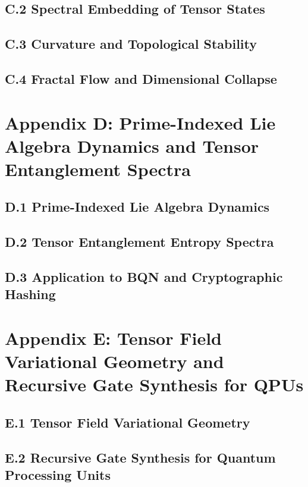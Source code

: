\subsection{C.2 Spectral Embedding of Tensor States}

\subsection{C.3 Curvature and Topological Stability}

\subsection{C.4 Fractal Flow and Dimensional Collapse}

\section{Appendix D: Prime-Indexed Lie Algebra Dynamics and Tensor Entanglement Spectra}
\subsection{D.1 Prime-Indexed Lie Algebra Dynamics}

\subsection{D.2 Tensor Entanglement Entropy Spectra}

\subsection{D.3 Application to BQN and Cryptographic Hashing}

\section{Appendix E: Tensor Field Variational Geometry and Recursive Gate Synthesis for QPUs}
\subsection{E.1 Tensor Field Variational Geometry}

\subsection{E.2 Recursive Gate Synthesis for Quantum Processing Units}
